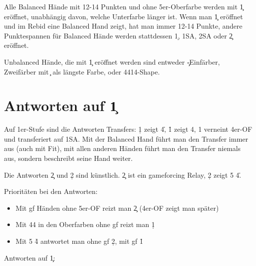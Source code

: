 Alle Balanced Hände mit 12-14 Punkten und ohne 5er-Oberfarbe werden mit 1\c{} eröffnet, unabhängig davon, welche Unterfarbe länger ist.
Wenn man 1\c{} eröffnet und im Rebid eine Balanced Hand zeigt, hat man immer 12-14 Punkte,
andere Punktespannen für Balanced Hände werden stattdessen 1\d, 1SA, 2SA oder 2\c{} eröffnet.

Unbalanced Hände, die mit 1\c{} eröffnet werden sind entweder \c-Einfärber, Zweifärber mit \c{} als längste Farbe, oder 4414-Shape.

\section{Antworten auf 1\c\rs} \label{sec:1c}

Auf 1er-Stufe sind die Antworten Transfers: 1\d\ra{} zeigt 4\rplus\h, 1\h\ra{} zeigt 4\rplus\s, 1\s\ra{} verneint 4er-OF und \glqq transferiert\grqq{} auf 1SA.
Mit der Balanced Hand führt man den Transfer immer aus (auch mit Fit),
mit allen anderen Händen führt man den Transfer niemals aus, sondern beschreibt seine Hand weiter.

Die Antworten 2\c{} und 2\d{} sind künstlich. 2\c\ra{} ist ein gameforcing Relay, 2\d\ra{} zeigt 5\rplus\s{} 4\rplus\h.

Prioritäten bei den Antworten:
\begin{itemize}
	\item Mit gf Händen ohne 5er-OF reizt man 2\c\ra{} (4er-OF zeigt man später)
	\item Mit 44 in den Oberfarben ohne gf reizt man 1\d\ra
	\item Mit 5\rplus\s{} 4\rplus\h{} antwortet man ohne gf 2\d\ra, mit gf 1\h\ra
\end{itemize}


Antworten auf 1\c\rs:
\nopagebreak

